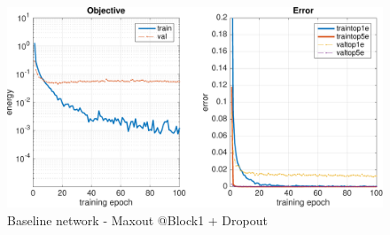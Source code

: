 \documentclass[11pt]{article}
\begin{document}
	\begin{figure}[H]
	    \centering
	    \includegraphics[width=15cm]{v8}
	    \caption{Baseline network - Maxout @Block1 + Dropout}
	\end{figure}

\end{document}
